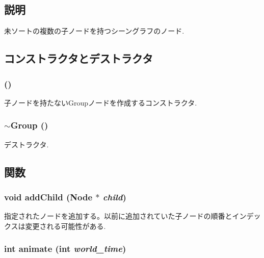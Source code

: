 \subsection{説明}
未ソートの複数の子ノードを持つシーングラフのノード. 

\subsection{コンストラクタとデストラクタ}
\hypertarget{classm3g_1_1Group_0b29b9393b4b6856ac75b759f4166c13}{
\subsubsection[{Group}]{ ()}}
\label{classm3g_1_1Group_0b29b9393b4b6856ac75b759f4166c13}


子ノードを持たないGroupノードを作成するコンストラクタ. \hypertarget{classm3g_1_1Group_a2a755272411c0d861f46f30970f5ca5}{
\subsubsection[{$\sim$Group}]{\setlength{\rightskip}{0pt plus 5cm}$\sim${\bf Group} ()}}
\label{classm3g_1_1Group_a2a755272411c0d861f46f30970f5ca5}


デストラクタ. 

\subsection{関数}
\hypertarget{classm3g_1_1Group_f7c798f6f7924dc14403df261f82153a}{
\subsubsection[{addChild}]{\setlength{\rightskip}{0pt plus 5cm}void addChild ({\bf Node} $\ast$ {\em child})}}
\label{classm3g_1_1Group_f7c798f6f7924dc14403df261f82153a}


指定されたノードを追加する。以前に追加されていた子ノードの順番とインデックスは変更される可能性がある. \hypertarget{classm3g_1_1Group_8aad1ceab4c2a03609c8a42324ce484d}{
\subsubsection[{animate}]{\setlength{\rightskip}{0pt plus 5cm}int animate (int {\em world\_\-time})}}
\label{classm3g_1_1Group_8aad1ceab4c2a03609c8a42324ce484d}


